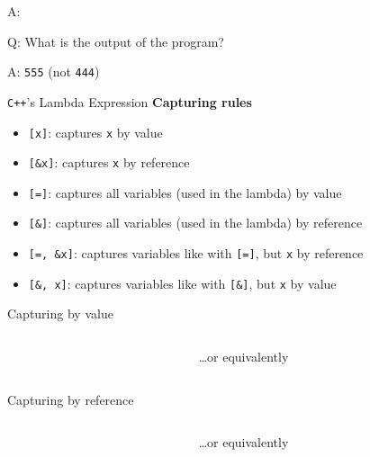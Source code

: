\addtocounter{framenumber}{-1}
\begin{frame}[fragile]{A: }
\end{frame}

\begin{frame}[fragile]{Q: What is the output of the program?}
\end{frame}

\addtocounter{framenumber}{-1}
\begin{frame}[fragile]{A: \texttt{555} (not \texttt{444})}
\end{frame}

\begin{frame}[fragile]{\texttt{C++}'s Lambda Expression}
    \textbf{Capturing rules}
    \begin{itemize}
        \item \texttt{[x]}: captures \texttt{x} by value
        \item \texttt{[\&x]}: captures \texttt{x} by reference
        \item \texttt{[=]}: captures all variables (used in the lambda) by value
        \item \texttt{[\&]}: captures all variables (used in the lambda) by reference
        \item \texttt{[=, \&x]}: captures variables like with \texttt{[=]}, but \texttt{x} by reference
        \item \texttt{[\&, x]}: captures variables like with \texttt{[\&]}, but \texttt{x} by value
    \end{itemize}
\end{frame}

\begin{frame}[fragile]{Capturing by value}
    \begin{columns}[t]
        \begin{column}{.45\textwidth}
        \end{column}
        \begin{column}{.45\textwidth}
            \ldots or equivalently
        \end{column}
    \end{columns}
\end{frame}

\begin{frame}[fragile]{Capturing by reference}
    \begin{columns}[t]
        \begin{column}{.45\textwidth}
        \end{column}
        \begin{column}{.45\textwidth}
            \ldots or equivalently
        \end{column}
    \end{columns}
\end{frame}

